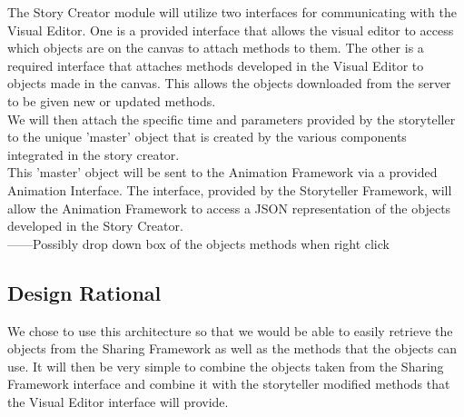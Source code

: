 \documentclass[12pt]{article}
\begin{document}
The Story Creator module will utilize two interfaces for communicating with the Visual Editor. One is a provided interface that allows the visual editor to access which objects are on the canvas to attach methods to them. The other is a required interface that attaches methods developed in the Visual Editor to objects made in the canvas. This allows the objects downloaded from the server to be given new or updated methods. \\

We will then attach the specific time and parameters provided by the storyteller to the unique 'master' object that is created by the various components integrated in the story creator. \\ 

This 'master' object will be sent to the Animation Framework via a provided Animation Interface. The interface, provided by the Storyteller Framework, will allow the Animation Framework to access a JSON representation of the objects developed in the Story Creator. \\

------Possibly drop down box of the objects methods when right click

\subsection{Design Rational}
We chose to use this architecture so that we would be able to easily retrieve the objects from the Sharing Framework as well as the methods that the objects can use.  It will then be very simple to combine the objects taken from the Sharing Framework interface and combine it with the storyteller modified methods that the Visual Editor interface will provide.  

\end{document}
